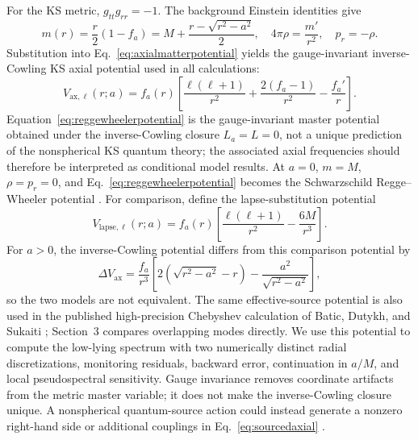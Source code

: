 \documentclass[12pt,a4paper]{article}
\begin{document}
For the KS metric, \(g_{tt}g_{rr}=-1\).  The background Einstein identities
give
\begin{equation}
m(r)=\frac{r}{2}\left(1-f_a\right)
=M+\frac{r-\sqrt{r^2-a^2}}{2},
\quad
4\pi\rho=\frac{m'}{r^2},
\quad
p_r=-\rho.
\label{eq:kseffectivesource}
\end{equation}
Substitution into Eq.~\eqref{eq:axialmatterpotential} yields the
gauge-invariant inverse-Cowling KS axial potential used in all calculations:
\begin{equation}
V_{\mathrm{ax},\ell}(r;a)
=f_a(r)\left[
\frac{\ell(\ell+1)}{r^2}
+\frac{2(f_a-1)}{r^2}
-\frac{f_a'}{r}\right].
\label{eq:reggewheelerpotential}
\end{equation}
Equation~\eqref{eq:reggewheelerpotential} is the gauge-invariant master
potential obtained under the inverse-Cowling closure \(L_a=L=0\), not a unique
prediction of the nonspherical KS quantum theory; the associated axial
frequencies should therefore be interpreted as conditional model results.
At \(a=0\), \(m=M\), \(\rho=p_r=0\), and
Eq.~\eqref{eq:reggewheelerpotential} becomes the Schwarzschild
Regge--Wheeler potential \cite{Regge1957}. For comparison, define the
lapse-substitution potential
\begin{equation}
V_{\mathrm{lapse},\ell}(r;a)
=f_a(r)\left[\frac{\ell(\ell+1)}{r^2}-\frac{6M}{r^3}\right].
\label{eq:lapsecomparison}
\end{equation}
For \(a>0\), the inverse-Cowling potential differs from this comparison
potential by
\begin{equation}
\Delta V_{\mathrm{ax}}
=\frac{f_a}{r^3}\left[
2\!\left(\sqrt{r^2-a^2}-r\right)
-\frac{a^2}{\sqrt{r^2-a^2}}\right],
\label{eq:axialproxycorrection}
\end{equation}
so the two models are not equivalent.  The same
effective-source potential is also used in the published high-precision
Chebyshev calculation of Batic, Dutykh, and Sukaiti
\cite{BaticDutykhSukaiti2026}; Section~3 compares overlapping modes directly.
We use this potential to compute the low-lying spectrum with two numerically
distinct radial discretizations, monitoring residuals, backward error, continuation in
\(a/M\), and local pseudospectral sensitivity. Gauge
invariance removes coordinate artifacts from the metric master variable; it
does not make the inverse-Cowling closure unique.  A nonspherical quantum-source
action could instead generate a nonzero right-hand side or additional
couplings in Eq.~\eqref{eq:sourcedaxial} \cite{Gerlach1979,Gundlach1999,Karlovini2002}.
\end{document}
